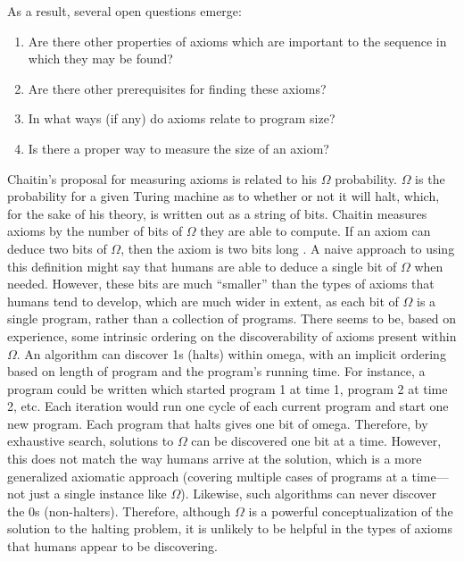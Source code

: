 As a result, several open questions emerge:

\begin{enumerate}
\item Are there other properties of axioms which are important to the sequence in which they may be found?
\item Are there other prerequisites for finding these axioms?
\item In what ways (if any) do axioms relate to program size?
\item Is there a proper way to measure the size of an axiom?
\end{enumerate}

Chaitin's proposal for measuring axioms is related to his $\Omega$ probability.  $\Omega$ is the probability for a given Turing machine as to whether or not it will halt, which, for the sake of his theory, is written out as a string of bits.  Chaitin measures axioms by the number of bits of $\Omega$ they are able to compute.  If an axiom can deduce two bits of $\Omega$, then the axiom is two bits long \citep{chaitin2007}.  A naive approach to using this definition might say that humans are able to deduce a single bit of $\Omega$ when needed.  However, these bits are much ``smaller'' than the types of axioms that humans tend to develop, which are much wider in extent, as each bit of $\Omega$ is a single program, rather than a collection of programs. There seems to be, based on experience, some intrinsic ordering on the discoverability of axioms present within $\Omega$.  An algorithm can discover 1s (halts) within omega, with an implicit ordering based on length of program and the program's running time.  For instance, a program could be written which started program 1 at time 1, program 2 at time 2, etc.  Each iteration would run one cycle of each current program and start one new program.  Each program that halts gives one bit of omega.  Therefore, by exhaustive search, solutions to $\Omega$ can be discovered one bit at a time.  However, this does not match the way humans arrive at the solution, which is a more generalized axiomatic approach (covering multiple cases of programs at a time---not just a single instance like $\Omega$).  Likewise, such algorithms can never discover the 0s (non-halters).   Therefore, although $\Omega$ is a powerful conceptualization of the solution to the halting problem, it is unlikely to be helpful in the types of axioms that humans appear to be discovering.

